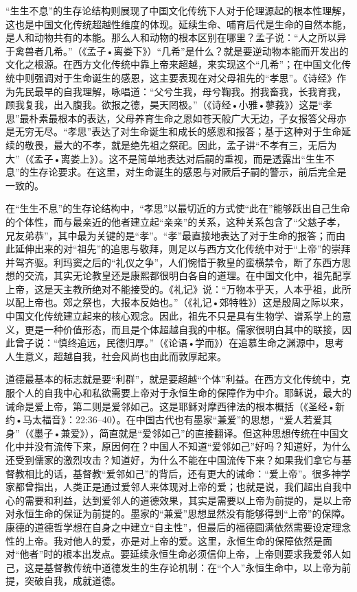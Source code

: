 \documentclass[UTF8, 12pt, a4paper]{ctexrep}
\begin{document}
“生生不息”的生存论结构则展现了中国文化传统下人对于伦理源起的根本性理解，这也是中国文化传统超越性维度的体现。延续生命、哺育后代是生命的自然本能，是人和动物共有的本能。那么人和动物的根本区别在哪里？孟子说：“人之所以异于禽兽者几希。”（《孟子•离娄下》）“几希”是什么？就是要逆动物本能而开发出的文化之根源。在西方文化传统中靠上帝来超越，来实现这个“几希”；在中国文化传统中则强调对于生命诞生的感恩，这主要表现在对父母祖先的“孝思”。《诗经》作为先民最早的自我理解，咏唱道：“父兮生我，母兮鞠我。拊我畜我，长我育我，顾我复我，出入腹我。欲报之德，昊天罔极。”（《诗经•小雅•蓼莪》）这是“孝思”最朴素最根本的表达，父母养育生命之恩如苍天般广大无边，子女报答父母亦是无穷无尽。“孝思”表达了对生命诞生和成长的感恩和报答；基于这种对于生命延续的敬畏，最大的不孝，就是绝先祖之祭祀。因此，孟子讲“不孝有三，无后为大”（《孟子•离娄上》）。这不是简单地表达对后嗣的重视，而是透露出“生生不息”的生存论要求。在这里，对生命诞生的感恩与对厥后子嗣的警示，前后完全是一致的。

在“生生不息”的生存论结构中，“孝思”以最切近的方式使“此在”能够跃出自己生命的个体性，而与最亲近的他者建立起“亲亲”的关系，这种关系包含了“父慈子孝，兄友弟恭”，其中最为关键的是“孝”。“孝”最直接地表达了对于生命的报答；而由此延伸出来的对“祖先”的追思与敬拜，则足以与西方文化传统中对于“上帝”的崇拜并驾齐驱。利玛窦之后的“礼仪之争”，人们惋惜于教皇的蛮横禁令，断了东西方思想的交流，其实无论教皇还是康熙都很明白各自的道理。在中国文化中，祖先配享上帝，这是天主教所绝对不能接受的。《礼记》说：“万物本乎天，人本乎祖，此所以配上帝也。郊之祭也，大报本反始也。”（《礼记•郊特牲》）这是殷周之际以来，中国文化传统建立起来的核心观念。因此，祖先不只是具有生物学、谱系学上的意义，更是一种价值形态，而且是个体超越自我的中枢。儒家很明白其中的联接，因此曾子说：“慎终追远，民德归厚。”（《论语•学而》）在追慕生命之渊源中，思考人生意义，超越自我，社会风尚也由此而敦厚起来。

道德最基本的标志就是要“利群”，就是要超越“个体”利益。在西方文化传统中，克服个人的自我中心和私欲需要上帝对于永恒生命的保障作为中介。耶稣说，最大的诫命是爱上帝，第二则是爱邻如己。这是耶稣对摩西律法的根本概括（《圣经•新约•马太福音》：22:36–40）。在中国古代也有墨家“兼爱”的思想，“爱人若爱其身”（《墨子•兼爱》），简直就是“爱邻如己”的直接翻译。但这种思想传统在中国文化中并没有流传下来，原因何在？中国人不知道“爱邻如己”好吗？知道好，为什么还受到儒家的激烈攻击？知道好，为什么不能在中国流传下来？如果我们拿它与基督教相比的话，基督教“爱邻如己”的背后，还有更大的诫命：“爱上帝”。很多神学家都曾指出，人类正是通过爱邻人来体现对上帝的爱；也就是说，我们超出自我中心的需要和利益，达到爱邻人的道德效果，其实是需要以上帝为前提的，是以上帝对永恒生命的保证为前提的。墨家的“兼爱”思想显然没有能够得到“上帝”的保障。康德的道德哲学想在自身之中建立“自主性”，但最后的福德圆满依然需要设定理念性的上帝。我对他人的爱，亦是对上帝的爱。这里，永恒生命的保障依然是面对“他者”时的根本出发点。要延续永恒生命必须信仰上帝，上帝则要求我爱邻人如己，这是基督教传统中道德发生的生存论机制：在“个人”永恒生命中，以上帝为前提，突破自我，成就道德。
\end{document}
